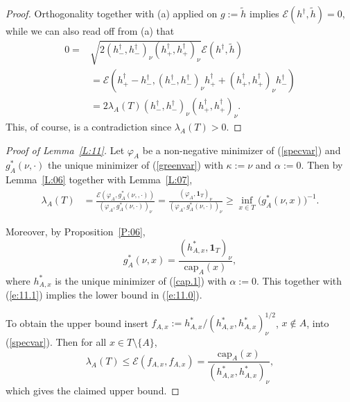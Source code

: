 \documentclass[11pt]{amsart}
\numberwithin{equation}{section}
\begin{document}
{\begin{proof}
Orthogonality together with (a) applied on $g:=\tilde{h}$ implies ${\mathcal E}(h^\dagger,\tilde{h})=0$, while we can also read off from (a) that
\begin{equation}
\label{e:readoff}
\begin{aligned}
0=   &\sqrt{2(h_-^\dagger,h_-^\dagger)_\nu(h^\dagger_+,h^\dagger_+)_\nu}{\mathcal E}(h^\dagger,\tilde{h})
 \\
 &=
   {\mathcal E}(h^\dagger_+-h^\dagger_{-},(h_-^\dagger,h_-^\dagger)_\nu h_+^\dagger+(h^\dagger_+,h^\dagger_+)_\nu h_-^\dagger)
  \\
 &=
   2\lambda_A(T)(h_-^\dagger,h_-^\dagger)_\nu(h^\dagger_+,h^\dagger_+)_\nu.
\end{aligned}
\end{equation}
This, of course, is a contradiction since $\lambda_A(T)>0$.
\end{proof}{\smallskip}

\begin{proof}[Proof of Lemma~\ref{L:11}] Let $\varphi_A$ be
a non-negative minimizer of (\ref{specvar}) and  $g^\ast_A(\nu,\boldsymbol{\cdot})$
the unique minimizer of (\ref{greenvar}) with $\kappa:=\nu$ and $\alpha:=0$.
Then by Lemma~\ref{L:06} together with Lemma~\ref{L:07},
\begin{equation}\label{e:11.1}
\begin{aligned}
   \lambda_A(T)
 &=
   \frac{{\mathcal E}(\varphi_A,g^\ast_A(\nu,,\boldsymbol{\cdot}))}{(\varphi_A,g_A^\ast(\nu,\boldsymbol{\cdot}))_{\nu}}
 = \frac{(\varphi_A,\mathbf{1}_T)_{\nu}}{(\varphi_A,g^\ast_A(\nu,\boldsymbol{\cdot}))_{\nu}}
 \geq
   \inf_{x\in T}\big(g_A^\ast(\nu,x)\big)^{-1}.
\end{aligned}
\end{equation}

Moreover, by Proposition~\ref{P:06},
\begin{equation}\label{e:11.4}
   g_A^\ast(\nu,x)
 =
   \frac{(h^\ast_{A,x},\mathbf{1}_T)_{\nu}}{\mathrm{cap}_{A}(x)},
\end{equation}
where $h^\ast_{A,x}$ is the unique minimizer of (\ref{cap.1}) with $\alpha:=0$. This together with (\ref{e:11.1})
implies the {{\it} lower bound} in (\ref{e:11.0}).

To obtain the {{\it} upper bound} insert $f_{A,x}:=h^\ast_{A,x}/(h^\ast_{A,x},h^\ast_{A,x})_{\nu}^{1/2}$, $x\not\in A$,
into (\ref{specvar}). Then for all $x\in T\setminus\{A\}$,
\begin{equation}\label{e:11.2}
   \lambda_A(T)
 \leq
   {\mathcal E}(f_{A,x},f_{A,x})
 =
   \frac{{\mathrm{cap}_{A}(x)}}{(h^\ast_{A,x},h^\ast_{A,x})_{\nu}},
\end{equation}
which gives the claimed upper bound.
\end{proof}{\smallskip}

}
\end{document}
